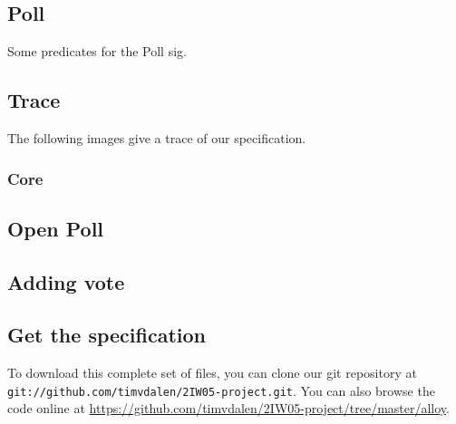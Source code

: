 		
		
	\subsection{Poll}
		Some predicates for the Poll sig.
		
		
		
\subsection{Trace}
	The following images give a trace of our specification.
	
	\subsubsection{Core}
		
	\subsection{Open Poll}
		
		
	\subsection{Adding vote}
		
	
\subsection{Get the specification}
	To download this complete set of files, you can clone our git repository at \texttt{git://github.com/timvdalen/2IW05-project.git}. You can also browse the code online at \url{https://github.com/timvdalen/2IW05-project/tree/master/alloy}.